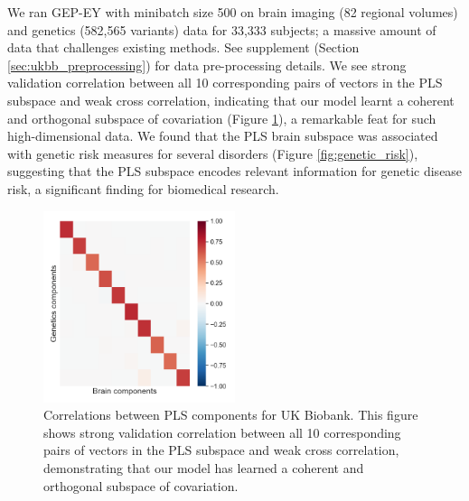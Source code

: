 We ran GEP-EY with minibatch size 500 on brain imaging (82 regional volumes) and genetics (582,565 variants) data for 33,333 subjects; a massive amount of data that challenges existing methods.
See supplement (Section \ref{sec:ukbb_preprocessing}) for data pre-processing details.
We see strong validation correlation between all 10 corresponding pairs of vectors in the PLS subspace and weak cross correlation, indicating that our model learnt a coherent and orthogonal subspace of covariation (Figure \ref{fig:UKBB_corr}), a remarkable feat for such high-dimensional data.
We found that the PLS brain subspace was associated with genetic risk measures for several disorders (Figure \ref{fig:genetic_risk}), suggesting that the PLS subspace encodes relevant information for genetic disease risk, a significant finding for biomedical research.


\begin{figure}
    \centering
    \includegraphics[width=0.5\textwidth,trim={0.8cm 0cm 0.3cm 0cm}]{figures/gradient_descent/UKBB/cross_corr}
    \caption{Correlations between PLS components for UK Biobank. This figure shows strong validation correlation between all 10 corresponding pairs of vectors in the PLS subspace and weak cross correlation, demonstrating that our model has learned a coherent and orthogonal subspace of covariation.}
    \label{fig:UKBB_corr}
\end{figure}

